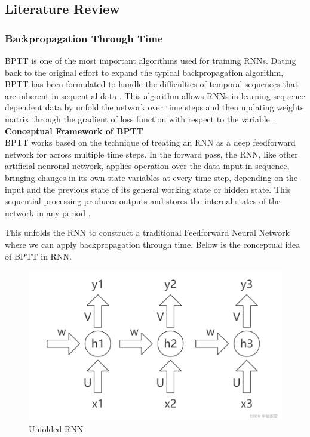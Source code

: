 \documentclass[12pt,a4paper]{article}
\begin{document}
\newpage

\subsection{Literature Review}
\subsubsection{Backpropagation Through Time}
BPTT is one of the most important algorithms used for training RNNs. Dating back to the original effort to expand the typical backpropagation algorithm, BPTT has been formulated to handle the difficulties of temporal sequences that are inherent in sequential data \parencite{werbos1990bptt}. This algorithm allows RNNs in learning sequence dependent data by unfold the network over time steps and then updating weights matrix through the gradient of loss function with respect to the variable \parencite{rumelhart1986backpropagation}.
\\[2ex]
\textbf{Conceptual Framework of BPTT}
\\[1ex]
BPTT works based on the technique of treating an RNN as a deep feedforward network for across multiple time steps. In the forward pass, the RNN, like other artificial neuronal network, applies operation over the data input in sequence, bringing changes in its own state variables at every time step, depending on the input and the previous state of its general working state or hidden state. This sequential processing produces outputs and stores the internal states of the network in any period \parencite{werbos1990bptt}.

This unfolds the RNN to construct a traditional Feedforward Neural Network where we can apply backpropagation through time. Below is the conceptual idea of BPTT in RNN.
\begin{figure}[h!]
    \centering
    \includegraphics[width=1\textwidth]{../Pic/pic1.png} %
    \caption{Unfolded RNN}
\end{figure}
\end{document}

